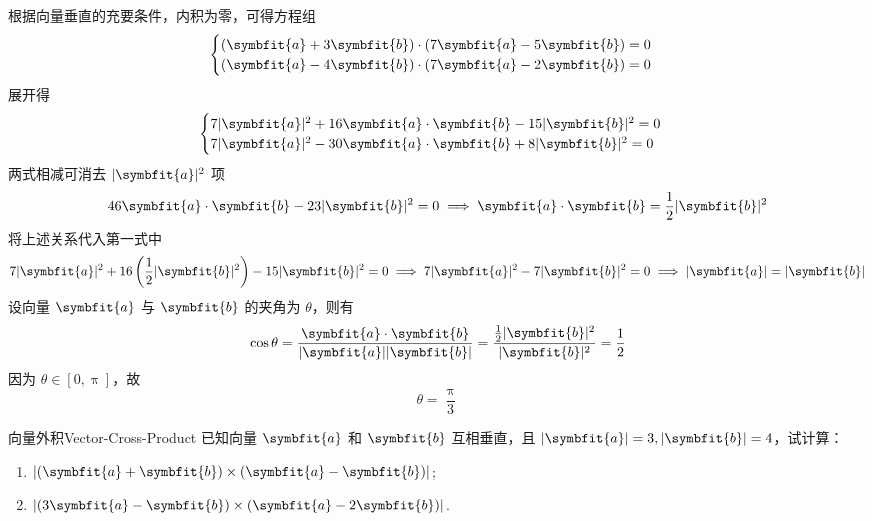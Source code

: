 \begin{solution}
    根据向量垂直的充要条件，内积为零，可得方程组
    \begin{equation}
        \begin{cases}
            (\symbfit{a} + 3\symbfit{b}) \cdot (7\symbfit{a} - 5\symbfit{b}) = 0 \\
            (\symbfit{a} - 4\symbfit{b}) \cdot (7\symbfit{a} - 2\symbfit{b}) = 0
        \end{cases}
    \end{equation}
    展开得
    \begin{equation}
        \begin{cases}
            7|\symbfit{a}|^2 + 16\symbfit{a} \cdot \symbfit{b} - 15|\symbfit{b}|^2 = 0 \\
            7|\symbfit{a}|^2 - 30\symbfit{a} \cdot \symbfit{b} + 8|\symbfit{b}|^2 = 0
        \end{cases}
    \end{equation}
    两式相减可消去 $|\symbfit{a}|^2$ 项
    \begin{equation}
        46\symbfit{a} \cdot \symbfit{b} - 23|\symbfit{b}|^2 = 0 \implies \symbfit{a} \cdot \symbfit{b} = \frac{1}{2}|\symbfit{b}|^2
    \end{equation}
    将上述关系代入第一式中
    \begin{equation}
        7|\symbfit{a}|^2 + 16 \left( \frac{1}{2}|\symbfit{b}|^2 \right) - 15|\symbfit{b}|^2 = 0 \implies 7|\symbfit{a}|^2 - 7|\symbfit{b}|^2 = 0 \implies |\symbfit{a}| = |\symbfit{b}|
    \end{equation}
    设向量 $\symbfit{a}$ 与 $\symbfit{b}$ 的夹角为 $\theta$，则有
    \begin{equation}
        \cos \theta = \frac{\symbfit{a} \cdot \symbfit{b}}{|\symbfit{a}||\symbfit{b}|} = \frac{\frac{1}{2}|\symbfit{b}|^2}{|\symbfit{b}|^2} = \frac{1}{2}
    \end{equation}
    因为 $\theta \in [0, \uppi]$，故
    \begin{equation}
        \boxed{\theta = \frac{\uppi}{3}}
    \end{equation}
\end{solution}

\begin{problem}{向量外积}{Vector-Cross-Product}
    已知向量 $\symbfit{a}$ 和 $\symbfit{b}$ 互相垂直，且 $|\symbfit{a}| = 3, |\symbfit{b}| = 4$，试计算：
    \begin{enumerate}
        \item $|(\symbfit{a} + \symbfit{b}) \times (\symbfit{a} - \symbfit{b})|$;
        \item $|(3\symbfit{a} - \symbfit{b}) \times (\symbfit{a} - 2\symbfit{b})|$.
    \end{enumerate}
\end{problem}

